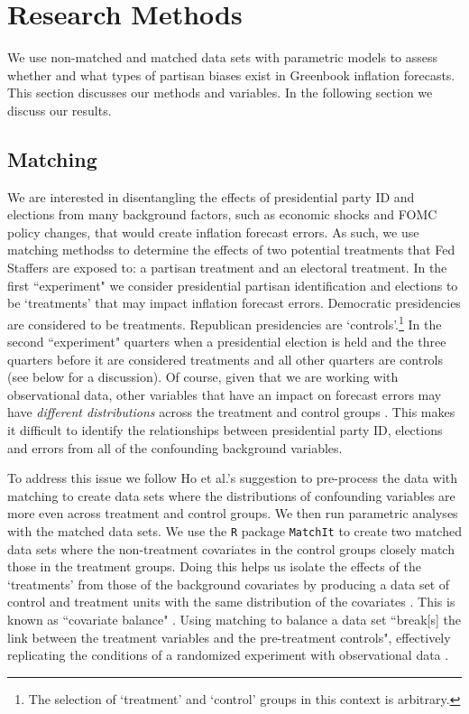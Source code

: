 \documentclass[a4paper]{article}\usepackage{graphicx, color}
\begin{document}

\section{Research Methods}

We use non-matched and matched data sets with parametric models \citep[see][]{Ho2007} to assess whether and what types of partisan biases exist in Greenbook inflation forecasts. This section discusses our methods and variables. In the following section we discuss our results.

\subsection{Matching}

We are interested in disentangling the effects of presidential party ID and elections from many background factors, such as economic shocks and FOMC policy changes, that would create inflation forecast errors. As such, we use matching methodss to determine the effects of two potential treatments that Fed Staffers are exposed to: a partisan treatment and an electoral treatment. In the first ``experiment" we consider presidential partisan identification and elections to be `treatments' that may impact inflation forecast errors. Democratic presidencies are considered to be treatments. Republican presidencies are `controls'.\footnote{The selection of `treatment' and `control' groups in this context is arbitrary.} In the second ``experiment" quarters when a presidential election is held and the three quarters before it are considered treatments and all other quarters are controls (see below for a discussion). Of course, given that we are working with observational data, other variables that have an impact on forecast errors may have {\emph{different distributions}} across the treatment and control groups \citep{Cochran1973, Diamond2012}. This makes it difficult to identify the relationships between presidential party ID, elections and errors from all of the confounding background variables.

To address this issue we follow Ho et al.'s \citeyearpar{Ho2007} suggestion to pre-process the data with matching to create data sets where the distributions of confounding variables are more even across treatment and control groups. We then run parametric analyses with the matched data sets. We use the {\tt{R}} package {\tt{MatchIt}} \citep{matchit2011} to create two matched data sets where the non-treatment covariates in the control groups closely match those in the treatment groups. Doing this helps us isolate the effects of the `treatments' from those of the background covariates by producing a data set of control and treatment units with the same distribution of the covariates \citep{matchit2011}. This is known as ``covariate balance" \cite[1]{Diamond2012}. Using matching to balance a data set ``break[s] the link between the treatment variables and the pre-treatment controls", effectively replicating the conditions of a randomized experiment with observational data \cite[][2--3]{matchit2011}. 
\end{document}

